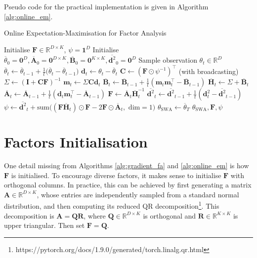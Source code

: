 \documentclass[msc,deptreport.inf]{infthesis} %
\newcommand{\matr}[1]{\mathbf{#1}}
\newcommand{\R}{\mathbb R}
\begin{document}
Pseudo code for the practical implementation is given in Algorithm \ref{alg:online_em}. 

\begin{algorithm}[!htbp] 
	\caption{Online Expectation-Maximisation for Factor Analysis}
	\label{alg:online_em}
	\begin{algorithmic}[1]
		\State Initialise $\matr{F} \in \R^{D \times K}$, $\psi = \matr{1}^D$
		\State Initialise $\overline{\theta}_0 = \matr{0}^D, \overline{\matr{A}}_0 = \matr{0}^{D \times K}, 
			\overline{\matr{B}}_0 = \matr{0}^{K \times K}, \overline{\matr{d}^2}_0 = \matr{0}^D$
			\State Sample observation $\theta_t \in \R^D$
			\State
				$\overline{\theta}_t \leftarrow  \overline{\theta}_{t-1} + \frac{1}{t}\big(\overline{\theta}_t - \overline{\theta}_{t-1}\big)$
			\State $\matr{d}_t \leftarrow \theta_t - \overline{\theta}_t$
			\State $\matr{C} \leftarrow (\matr{F} \odot \psi^{-1})^\intercal$ (with broadcasting)
			\State $\Sigma \leftarrow (\matr{I} + \matr{C} \matr{F})^{-1}$ 
			\State $\matr{m}_t \leftarrow \Sigma \matr{C} \matr{d}_t$ 
			\State $\overline{\matr{B}}_t \leftarrow \overline{\matr{B}}_{t-1} + \frac{1}{t} (\matr{m}_t \matr{m}_t^\intercal - \overline{\matr{B}}_{t-1})$
			\State $\overline{\matr{H}}_t \leftarrow \Sigma + \overline{\matr{B}}_t$
			\State $\overline{\matr{A}}_t \leftarrow \overline{\matr{A}}_{t-1} + \frac{1}{t} (\matr{d}_t \matr{m}_t^\intercal - \overline{\matr{A}}_{t-1})$
			\State $\matr{F} \leftarrow \overline{\matr{A}}_t \overline{\matr{H}}_t^{-1}$
			\State $\overline{\matr{d}^2}_t \leftarrow \overline{\matr{d}^2}_{t-1} + \frac{1}{t} (\matr{d}_t^2 - \overline{\matr{d}^2}_{t-1})$
			\State $\psi \leftarrow 
				\overline{\matr{d}^2}_t
	+ \text{sum} \big((\matr{F} \overline{\matr{H}}_t) \odot \matr{F} -2\matr{F} \odot \overline{\matr{A}}_t , \text{ dim} = 1\big)$
		\EndFor
		\State $\theta_{\text{SWA}} \leftarrow \overline{\theta}_T$
		\State \Return $\theta_{\text{SWA}}, \matr{F}, \psi$
	\end{algorithmic}
\end{algorithm}

\section{Factors Initialisation}\label{sec:F_init}

One detail missing from Algorithms \ref{alg:gradient_fa} and \ref{alg:online_em} is how $\matr{F}$ is initialised. To encourage diverse factors, it makes sense to initialise $\matr{F}$ with orthogonal columns. In practice, this can be achieved by first generating a matrix $\matr{A}  \in \R^{D \times K}$, whose entries are independently sampled from a standard normal distribution, and then computing its reduced QR decomposition\footnote{https://pytorch.org/docs/1.9.0/generated/torch.linalg.qr.html}. This decomposition is $\matr{A} = \matr{Q}\matr{R}$, where $\matr{Q} \in \R^{D \times K}$ is orthogonal and $\matr{R} \in \R^{K \times K}$ is upper triangular. Then set $\matr{F} = \matr{Q}$.
\end{document}
